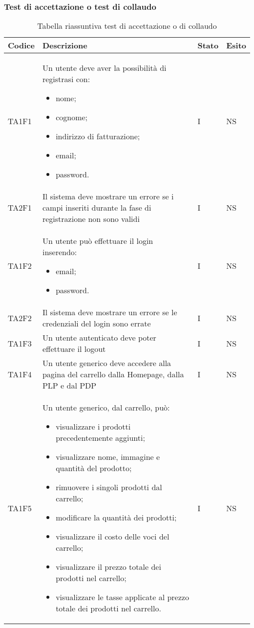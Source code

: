 \subsubsection{Test di accettazione o test di collaudo}
{

\centering
\renewcommand{\arraystretch}{2}
\begin{longtable}{C{2cm} C{9.6cm} C{1.5cm} C{1cm}}
\caption{Tabella riassuntiva test di accettazione o di collaudo}\\
\textbf{Codice} &
\textbf{Descrizione}&
\textbf{Stato}&
\textbf{Esito}\\
\endhead


TA1F1 & Un utente deve aver la possibilità di registrasi con:
\begin{itemize}
	\item nome;
	\item cognome;
	\item indirizzo di fatturazione;
	\item email;
	\item password.
\end{itemize} & I & NS\\
TA2F1 & Il sistema deve mostrare un errore se
i campi inseriti durante la fase di registrazione non sono validi & I & NS\\
TA1F2 & Un utente può effettuare il login inserendo:
\begin{itemize}
	\item email;
	\item password.
\end{itemize} & I & NS\\
TA2F2 & Il sistema deve mostrare un errore se le credenziali del login sono errate & I & NS\\
TA1F3 & Un utente autenticato deve poter effettuare il
logout & I & NS\\
TA1F4 & Un utente generico deve accedere alla pagina del carrello dalla Homepage, dalla PLP e dal PDP & I & NS\\
TA1F5 & Un utente generico, dal carrello, può:
\begin{itemize}
	\item visualizzare i prodotti precedentemente aggiunti;
	\item visualizzare nome, immagine e quantità del prodotto;
	\item rimuovere i singoli prodotti dal carrello;
	\item modificare la quantità dei prodotti;
	\item visualizzare il costo delle voci del carrello;
	\item visualizzare il prezzo totale dei prodotti nel carrello;
	\item visualizzare le tasse applicate al prezzo totale dei prodotti nel carrello.
\end{itemize}
& I & NS\\


\end{longtable}}
